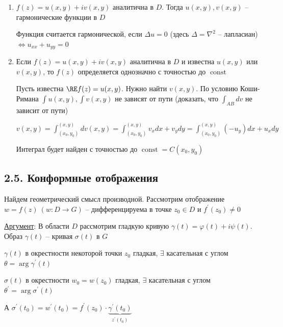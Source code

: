 \documentclass[12pt]{article}
\begin{document}
\begin{enumerate}[label=\arabic*$^\circ$]
    \item $f(z) = u(x, y) + i v(x, y)$ аналитична в $D$. Тогда $u(x, y), v(x, y)$ -- гармонические функции в $D$

    \begin{MyProof}
        Функция считается гармонической, если $\Delta u = 0$ (здесь $\Delta = \nabla^2$ -- лапласиан) $\Longleftrightarrow u_{xx} + u_{yy} = 0$
        
        \Lab
    \end{MyProof}

    \item Если $f(z) = u(x, y) + i v(x, y)$ аналитична в $D$ и известна $u(x, y)$ или $v(x, y)$, то $f(z)$ определяется однозначно с точностью до $\operatorname{const}$

    \begin{MyProof}
        Пусть известна $\RE f(z) = u(x, y)$. Нужно найти $v(x, y)$. По условию Коши-Римана $\int u(x, y), \int v(x, y)$ не зависят от пути
        (\Lab доказать, что $\int_{AB} dv$ не зависит от пути)

        $v(x, y) = \int_{(x_0, y_0)}^{(x, y)} dv(x, y) = \int_{(x_0, y_0)}^{(x, y)} v_x dx + v_y dy = \int_{(x_0, y_0)}^{(x, y)} (-u_y) dx + u_x dy$

        Интеграл будет найден с точностью до $\operatorname{const} = C(x_0, y_0)$
    \end{MyProof}

\end{enumerate}


\subsection{2.5. Конформные отображения}

Найдем геометрический смысл производной. Рассмотрим отображение $w = f(z) \ (w : D \longrightarrow G)$ -- дифференцируема в точке $z_0 \in D$ и $f^\prime(z_0) \neq 0$

\underline{Аргумент}: В области $D$ рассмотрим гладкую кривую $\gamma(t) = \varphi(t) + i\psi(t)$. Образ $\gamma(t)$ -- кривая $\sigma(t)$ в $G$

$\gamma(t)$ в окрестности некоторой точки $z_0$ гладкая, $\exists$ касательная с углом $\theta = \arg \gamma^\prime(t)$

$\sigma(t)$ в окрестности $w_0 = w(z_0)$ гладкая, $\exists$ касательная с углом $\theta^\prime = \arg \sigma^\prime(t)$

А $\sigma^\prime(t_0) = w^\prime (t_0) = f^\prime(z_0) \cdot \underset{z^\prime(t_0)}{\underbrace{\gamma^\prime(t_0)}}$
\end{document}
